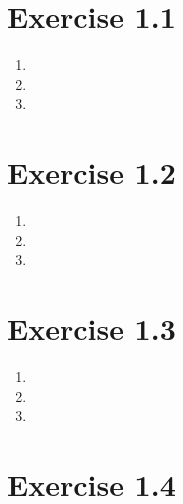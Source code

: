 \documentclass{article}
\begin{document}
\section*{Exercise 1.1}
\begin{enumerate}[label=(\alph*)]
	\item
	\item
	\item
\end{enumerate}

\section*{Exercise 1.2}
\begin{enumerate}[label=(\alph*)]
	\item
	\item
	\item
\end{enumerate}

\section*{Exercise 1.3}
\begin{enumerate}[label=(\alph*)]
	\item
	\item
	\item
\end{enumerate}

\section*{Exercise 1.4}
\end{document}

